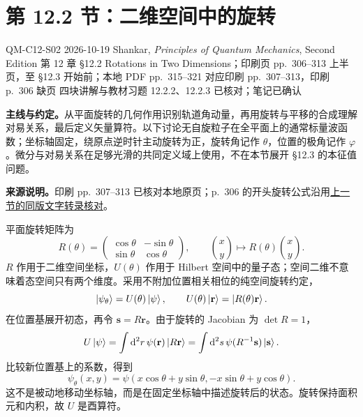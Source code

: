 \section{第 12.2 节：二维空间中的旋转}
\label{section:QM-C12-S02}
\studymeta
  {QM-C12-S02}
  {2026-10-19}
  {Shankar, \textit{Principles of Quantum Mechanics}, Second Edition}
  {第 12 章 \S 12.2 Rotations in Two Dimensions；印刷页 pp.~306--313 上半页，至 \S 12.3 开始前；本地 PDF pp.~315--321 对应印刷 pp.~307--313，印刷 p.~306 缺页}
  {四块讲解与教材习题 12.2.2、12.2.3 已核对；笔记已确认}

\textbf{主线与约定。}从平面旋转的几何作用识别轨道角动量，再用旋转与平移的合成理解对易关系，最后定义矢量算符。以下讨论无自旋粒子在全平面上的通常标量波函数；坐标轴固定，绕原点逆时针主动旋转为正，旋转角记作 $\theta$，位置的极角记作 $\varphi$。微分与对易关系在足够光滑的共同定义域上使用，不在本节展开 \S 12.3 的本征值问题。

\textbf{来源说明。}印刷 pp.~307--313 已核对本地原页；p.~306 的开头旋转公式沿用\hyperref[section:QM-C12-S01]{上一节的同版文字转录核对}。


平面旋转矩阵为
\begin{equation}
  R(\theta)=\begin{pmatrix}\cos\theta&-\sin\theta\\
    \sin\theta&\cos\theta\end{pmatrix},\qquad
  \binom{x}{y}\longmapsto R(\theta)\binom{x}{y}.
\end{equation}
$R$ 作用于二维空间坐标，$U(\theta)$ 作用于 Hilbert 空间中的量子态；空间二维不意味着态空间只有两个维度。采用不附加位置相关相位的纯空间旋转约定，
\begin{equation}
  \left|\psi_\theta\right\rangle=U(\theta)\left|\psi\right\rangle,\qquad
  U(\theta)\left|\mathbf r\right\rangle=\left|R(\theta)\mathbf r\right\rangle.
\end{equation}
在位置基展开初态，再令 $\mathbf s=R\mathbf r$。由于旋转的 Jacobian 为 $\det R=1$，
\begin{equation}
  U\left|\psi\right\rangle=\int\mathop{}\!\mathrm{d}^2r\,\psi(\mathbf r)\left|R\mathbf r\right\rangle
  =\int\mathop{}\!\mathrm{d}^2s\,\psi(R^{-1}\mathbf s)\left|\mathbf s\right\rangle.
\end{equation}
比较新位置基上的系数，得到
\begin{equation}
  \boxed{\psi_\theta(x,y)
  =\psi(x\cos\theta+y\sin\theta,-x\sin\theta+y\cos\theta)}.
  \label{eq:QM-C12-S02-inverse-argument}
\end{equation}
这不是被动地移动坐标轴，而是在固定坐标轴中描述旋转后的状态。旋转保持面积元和内积，故 $U$ 是酉算符。

